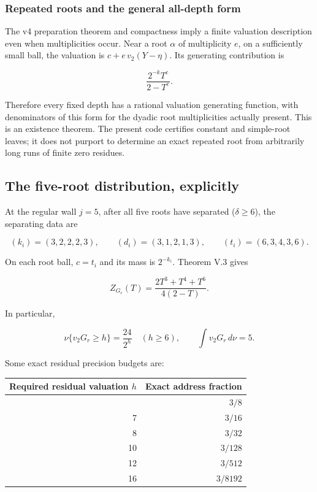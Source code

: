 \documentclass[11pt,letterpaper]{article}
\begin{document}
\subsubsection{Repeated roots and the general all-depth form}\label{repeated-roots-and-the-general-all-depth-form}

The v4 preparation theorem and compactness imply a finite valuation description even when multiplicities occur. Near a root \(\alpha\) of multiplicity \(e\), on a sufficiently small ball, the valuation is \(c+e\,v_2(Y-\eta)\). Its generating contribution is

\[
\frac{2^{-k}T^c}{2-T^e}.
\]

Therefore every fixed depth has a rational valuation generating function, with denominators of this form for the dyadic root multiplicities actually present. This is an existence theorem. The present code certifies constant and simple-root leaves; it does not purport to determine an exact repeated root from arbitrarily long runs of finite zero residues.

\subsection{The five-root distribution, explicitly}\label{the-five-root-distribution-explicitly}

At the regular wall \(j=5\), after all five roots have separated (\(\delta\ge6\)), the separating data are

\[
(k_i)=(3,2,2,2,3),\qquad
(d_i)=(3,1,2,1,3),\qquad
(t_i)=(6,3,4,3,6).
\]

On each root ball, \(c=t_i\) and its mass is \(2^{-k_i}\). Theorem V.3 gives

\[
\boxed{
 Z_{G_r}(T)=\frac{2T^3+T^4+T^6}{4(2-T)}.
} \tag{V.7}
\]

In particular,

\[
\boxed{
\nu\{v_2G_r\ge h\}=\frac{24}{2^h}
\quad(h\ge6),
\qquad
\int v_2G_r\,d\nu=5.
} \tag{V.8}
\]

Some exact residual precision budgets are:

\begin{longtable}[]{@{}rr@{}}
\toprule\noalign{}
Required residual valuation \(h\) & Exact address fraction \\
\midrule\noalign{}
\endhead
\bottomrule\noalign{}
\endlastfoot
6 & \(3/8\) \\
7 & \(3/16\) \\
8 & \(3/32\) \\
10 & \(3/128\) \\
12 & \(3/512\) \\
16 & \(3/8192\) \\
\end{longtable}
\end{document}

